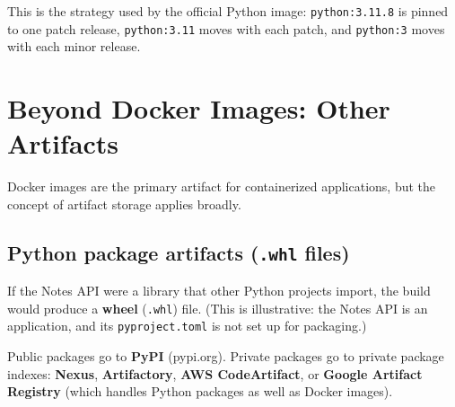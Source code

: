 \noindent{}This is the strategy used by the official Python image: \texttt{python:3.11.8} is pinned to one patch release, \texttt{python:3.11} moves with each patch, and \texttt{python:3} moves with each minor release.

\setcounter{section}{5}
\section{Beyond Docker Images: Other Artifacts}\label{19-artifact-storage:196-beyond-docker-images-other-artifacts}

Docker images are the primary artifact for containerized applications, but the concept of artifact storage applies broadly.

\subsection*{\texorpdfstring{Python package artifacts (\texttt{.whl} files)}{Python package artifacts (.whl files)}}\label{19-artifact-storage:python-package-artifacts-whl-files}

If the Notes API were a library that other Python projects import, the build would produce a \textbf{wheel} (\texttt{.whl}) file. (This is illustrative: the Notes API is an application, and its \texttt{pyproject.toml} is not set up for packaging.)

\begin{codebox}[short]

\begin{Shaded}
\begin{Highlighting}[]
 

\PreprocessorTok{*}
\end{Highlighting}
\end{Shaded}

\end{codebox}

\noindent{}Public packages go to \textbf{PyPI} (pypi.org). Private packages go to private package indexes: \textbf{Nexus}, \textbf{Artifactory}, \textbf{AWS CodeArtifact}, or \textbf{Google Artifact Registry} (which handles Python packages as well as Docker images).

